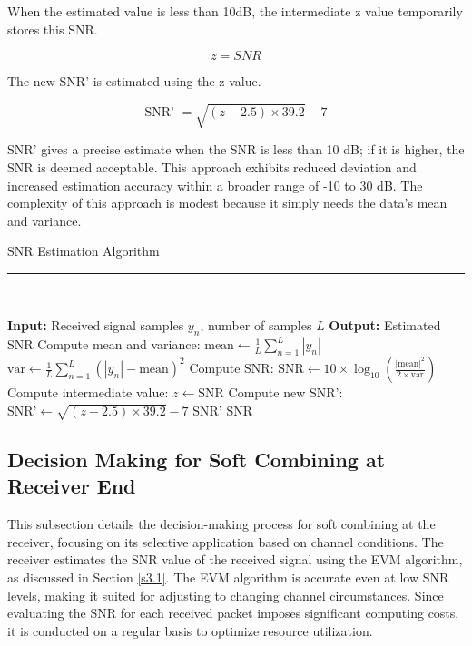 \documentclass[sn-mathphys-num]{sn-jnl}
\theoremstyle{thmstyleone}
\theoremstyle{thmstyletwo}%
\theoremstyle{thmstylethree}%
\begin{document}
When the estimated value is less than 10dB, the intermediate z value temporarily stores this SNR. 

\begin{equation} 
    z = SNR
\end{equation}

The new SNR’ \cite{r20} is estimated using the z value.

\begin{equation}
\text{SNR' } = \sqrt{ (z - 2.5) \times 39.2 } - 7
\end{equation}

SNR' gives a precise estimate when the SNR is less than 10 dB; if it is higher, the SNR is deemed acceptable. This approach exhibits reduced deviation and increased estimation accuracy within a broader range of -10 to 30 dB. The complexity of this approach is modest because it simply needs the data's mean and variance.

\begin{algorithm}
    \caption{SNR Estimation Algorithm }
    \rule{\linewidth}{0.5pt}\\
    \label{alg:snr_estimation}
    \begin{algorithmic}[1]
        \State \textbf{Input:} Received signal samples $y_n$, number of samples $L$
        \State \textbf{Output:} Estimated SNR
        \State Compute mean and variance:
        \State \quad $\text{mean} \gets \frac{1}{L} \sum_{n=1}^{L} |y_n|$
        \State \quad $\text{var} \gets \frac{1}{L} \sum_{n=1}^{L} (|y_n| - \text{mean})^2$
        \State Compute SNR:
        \State \quad $\text{SNR} \gets 10 \times \log_{10}\left(\frac{|\text{mean}|^2}{2 \times \text{var}}\right)$
            \State Compute intermediate value:
            \State \quad $z \gets \text{SNR}$
            \State Compute new SNR':
            \State \quad $\text{SNR'} \gets \sqrt{(z - 2.5) \times 39.2} - 7$
            \State \Return $\text{SNR'}$
        \Else
            \State \Return $\text{SNR}$
        \EndIf
    \end{algorithmic}
\end{algorithm}

\subsection{Decision Making for Soft Combining at Receiver End} \label{s3.5}

This subsection details the decision-making process for soft combining at the receiver, focusing on its selective application based on channel conditions. The receiver estimates the SNR value of the received signal using the EVM algorithm, as discussed in Section \ref{s3.1}. The EVM algorithm is accurate even at low SNR levels, making it suited for adjusting to changing channel circumstances. Since evaluating the SNR for each received packet imposes significant computing costs, it is conducted on a regular basis to optimize resource utilization.
\end{document}
